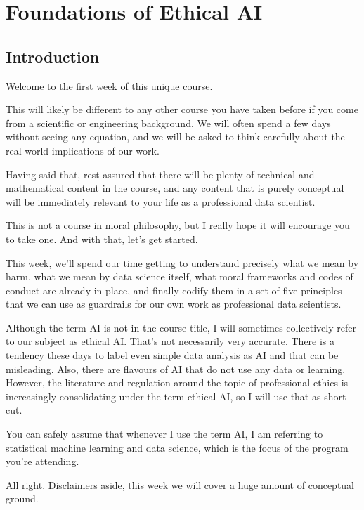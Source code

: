 \documentclass[
]{book}
\theoremstyle{definition}
\theoremstyle{definition}
\theoremstyle{definition}
\theoremstyle{definition}
\theoremstyle{remark}
\begin{document}
\hypertarget{ch-foundations}{%
\chapter{Foundations of Ethical AI}\label{ch-foundations}}

\hypertarget{introduction}{%
\section*{Introduction}\label{introduction}}

Welcome to the first week of this unique course.

This will likely be different to any other course you have taken before if you come from a scientific or engineering background. We will often spend a few days without seeing any equation, and we will be asked to think carefully about the real-world implications of our work.

Having said that, rest assured that there will be plenty of technical and mathematical content in the course, and any content that is purely conceptual will be immediately relevant to your life as a professional data scientist.

This is not a course in moral philosophy, but I really hope it will encourage you to take one. And with that, let's get started.

This week, we'll spend our time getting to understand precisely what we mean by harm, what we mean by data science itself, what moral frameworks and codes of conduct are already in place, and finally codify them in a set of five principles that we can use as guardrails for our own work as professional data scientists.

Although the term AI is not in the course title, I will sometimes collectively refer to our subject as ethical AI. That's not necessarily very accurate. There is a tendency these days to label even simple data analysis as AI and that can be misleading. Also, there are flavours of AI that do not use any data or learning. However, the literature and regulation around the topic of professional ethics is increasingly consolidating under the term ethical AI, so I will use that as short cut.

You can safely assume that whenever I use the term AI, I am referring to statistical machine learning and data science, which is the focus of the program you're attending.

All right. Disclaimers aside, this week we will cover a huge amount of conceptual ground.
\end{document}
